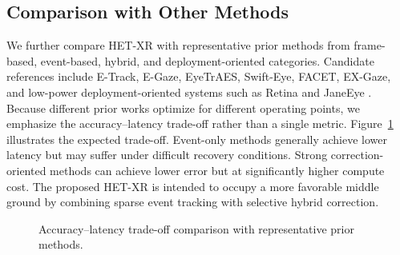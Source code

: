 \documentclass[journal]{IEEEtran}
\begin{document}
\subsection{Comparison with Other Methods}
We further compare HET-XR with representative prior methods from frame-based, event-based, hybrid, and deployment-oriented categories. Candidate references include E-Track, E-Gaze, EyeTrAES, Swift-Eye, FACET, EX-Gaze, and low-power deployment-oriented systems such as Retina and JaneEye \cite{li2023track,li2024gaze,sen2024eyetraes,zhang2024swift,ding2025facet,chen2025ex,bonazzi2024retina,han2026janeeye}. Because different prior works optimize for different operating points, we emphasize the accuracy--latency trade-off rather than a single metric.
%
Figure~\ref{fig:tradeoff} illustrates the expected trade-off. Event-only methods generally achieve lower latency but may suffer under difficult recovery conditions. Strong correction-oriented methods can achieve lower error but at significantly higher compute cost. The proposed HET-XR is intended to occupy a more favorable middle ground by combining sparse event tracking with selective hybrid correction.
%
\begin{figure}[t]
\centering
{}
\caption{Accuracy--latency trade-off comparison with representative prior methods.}
\label{fig:tradeoff}
\end{figure}
\end{document}
